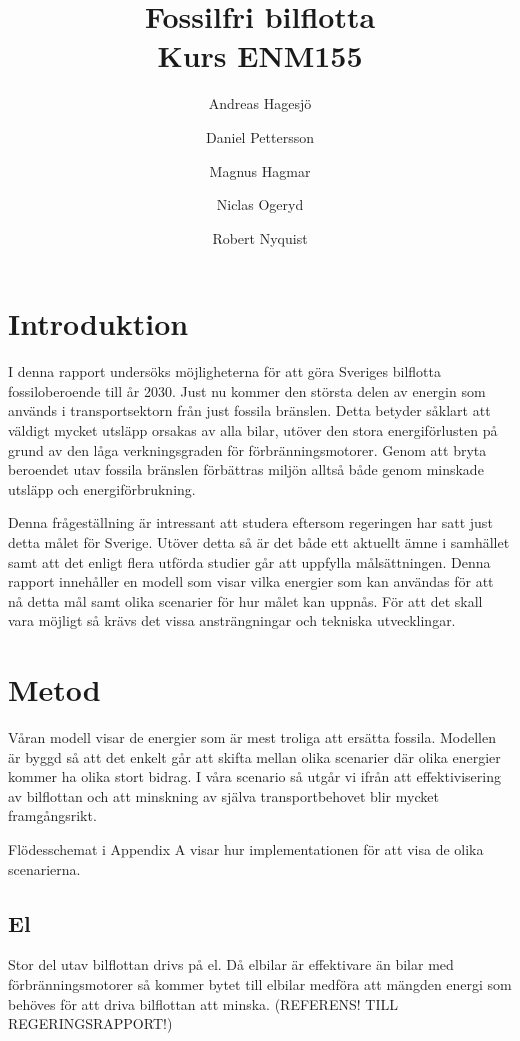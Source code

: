 \documentclass[a4paper,11pt,fleqn, titlepage]{article}
\author{Andreas Hagesjö \and Daniel Pettersson \and
Magnus Hagmar \and Niclas Ogeryd \and Robert Nyquist}
\title{Fossilfri bilflotta \\ Kurs ENM155}
\begin{document}
\maketitle

\section{Introduktion}
I denna rapport undersöks möjligheterna för att göra Sveriges bilflotta fossiloberoende till år 2030. Just nu kommer den största delen av energin som används i transportsektorn från just fossila bränslen. Detta betyder såklart att väldigt mycket utsläpp orsakas av alla bilar, utöver den stora energiförlusten på grund av den låga verkningsgraden för förbränningsmotorer. Genom att bryta beroendet utav fossila bränslen förbättras miljön alltså både genom minskade utsläpp och energiförbrukning.

Denna frågeställning är intressant att studera eftersom regeringen har satt just detta målet för Sverige. Utöver detta så är det både ett aktuellt ämne i samhället samt att det enligt flera utförda studier går att uppfylla målsättningen. Denna rapport innehåller en modell som visar vilka energier som kan användas för att nå detta mål samt olika scenarier för hur målet kan uppnås. För att det skall vara möjligt så krävs det vissa ansträngningar och tekniska utvecklingar. 

\section{Metod}

Våran modell visar de energier som är mest troliga att ersätta fossila. Modellen är byggd så att det enkelt går att skifta mellan olika scenarier där olika energier kommer ha olika stort bidrag.
I våra scenario så utgår vi ifrån att effektivisering av bilflottan och att minskning av själva transportbehovet blir mycket framgångsrikt.


Flödesschemat i Appendix A visar hur implementationen för att visa de olika scenarierna.

\subsection{El}

Stor del utav bilflottan drivs på el. Då elbilar är effektivare än bilar med förbränningsmotorer så kommer bytet till elbilar medföra att mängden energi som behöves för att driva bilflottan att minska. (REFERENS! TILL REGERINGSRAPPORT!)
\end{document}
